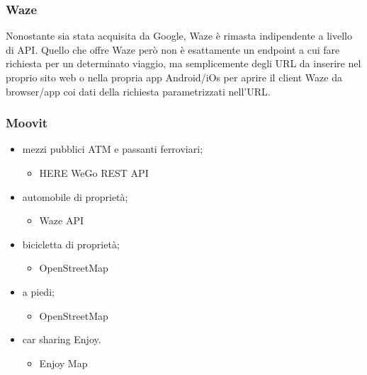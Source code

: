 \subsubsection{Waze}

Nonostante sia stata acquisita da Google, Waze è rimasta indipendente a livello di API. Quello che offre Waze però non è esattamente un endpoint a cui fare richiesta per un determinato viaggio, ma semplicemente degli URL da inserire nel proprio sito web o nella propria app Android/iOs per aprire il client Waze da browser/app coi dati della richiesta parametrizzati nell'URL.

\subsubsection{Moovit}







\begin{itemize}
	\item mezzi pubblici ATM e passanti ferroviari;
	\begin{itemize}
		\item HERE WeGo REST API\cite{herewegoapi}
	\end{itemize}
	\item automobile di proprietà;
	\begin{itemize}
		\item Waze API\cite{wazeapi}
	\end{itemize}
	\item bicicletta di proprietà;
	\begin{itemize}
		\item OpenStreetMap\cite{openstreetmap}
	\end{itemize}
	\item a piedi;
	\begin{itemize}
		\item OpenStreetMap\cite{openstreetmap}
	\end{itemize}
	\item car sharing Enjoy.
	\begin{itemize}
		\item Enjoy Map\cite{enjoycarsharing}
	\end{itemize}
\end{itemize}

